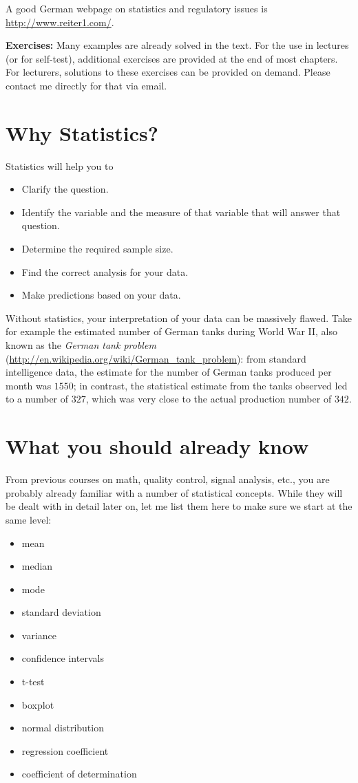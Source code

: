  A good German webpage on statistics and regulatory issues is \url{http://www.reiter1.com/}.

\vspace{5 mm}

\textbf{Exercises: }Many examples are already solved in the text. For the use in lectures (or for self-test), additional exercises are provided at the end of most chapters. For lecturers, solutions to these exercises can be provided on demand. Please contact me directly for that via email.

\section{Why Statistics?}

Statistics will help you to
\begin{itemize}
  \item Clarify the question.
  \item Identify the variable and the measure of that variable that will answer that question.
  \item Determine the required sample size.
  \item Find the correct analysis for your data.
  \item Make predictions based on your data.
\end{itemize}

Without statistics, your interpretation of your data can be massively flawed. Take for example the estimated number of German tanks during World War II, also known as the \emph{German tank problem} (\url{http://en.wikipedia.org/wiki/German_tank_problem}): from standard intelligence data, the estimate for the number of German tanks produced per month was $1550$; in contrast, the statistical estimate from the tanks observed led to a number of $327$, which was very close to the actual production number of $342$.

\section{What you should already know}

From previous courses on math, quality control, signal analysis, etc., you are probably already familiar with a number of statistical concepts. While they will be dealt with in detail later on, let me list them here to make sure we start at the same level:

\begin{itemize}
  \item mean
  \item median
  \item mode
  \item standard deviation
  \item variance
  \item confidence intervals
  \item t-test
  \item boxplot
  \item normal distribution
  \item regression coefficient
  \item coefficient of determination
\end{itemize}

